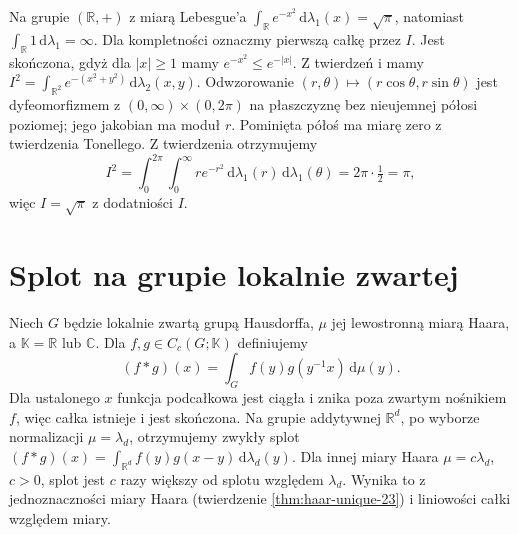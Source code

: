 \begin{przyklad}
Na grupie $(\mathbb{R},+)$ z miarą Lebesgue'a $\int_\mathbb{R} e^{-x^2}\,\mathrm d\lambda_1(x)=\sqrt\pi$, natomiast $\int_{\mathbb R}1\,\mathrm d\lambda_1=\infty$. Dla kompletności oznaczmy pierwszą całkę przez $I$.
Jest skończona, gdyż dla $|x|\ge1$ mamy
$e^{-x^2}\le e^{-|x|}$. Z twierdzeń
 i 
mamy $I^2=\int_{\mathbb R^2}e^{-(x^2+y^2)}
\,\mathrm d\lambda_2(x,y)$. Odwzorowanie
$(r,\theta)\mapsto(r\cos\theta,r\sin\theta)$
jest dyfeomorfizmem z $(0,\infty)\times(0,2\pi)$
na płaszczyznę bez nieujemnej półosi poziomej;
jego jakobian ma moduł $r$. Pominięta półoś ma
miarę zero z twierdzenia Tonellego. Z twierdzenia
 otrzymujemy
\[
 I^2=\int_0^{2\pi}\int_0^\infty re^{-r^2}
    \,\mathrm d\lambda_1(r)\,\mathrm d\lambda_1(\theta)
 =2\pi\cdot\tfrac12=\pi,
\]
więc $I=\sqrt\pi$ z dodatniości $I$.
\end{przyklad}

\section{Splot na grupie lokalnie zwartej}
\begin{definicja}
\label{it:def:haar-convolution}
Niech $G$ będzie lokalnie zwartą grupą Hausdorffa,
$\mu$ jej lewostronną miarą Haara, a
$\mathbb K=\mathbb R$ lub $\mathbb C$.
Dla $f,g\in C_c(G;\mathbb K)$ definiujemy
\[
 (f*g)(x)=\int_G f(y)g(y^{-1}x)\,\mathrm d\mu(y).
\]
Dla ustalonego $x$ funkcja podcałkowa jest ciągła
i znika poza zwartym nośnikiem $f$, więc całka
istnieje i jest skończona. Na grupie addytywnej
$\mathbb R^d$, po wyborze normalizacji $\mu=\lambda_d$,
otrzymujemy zwykły splot
$(f*g)(x)=\int_{\mathbb R^d}f(y)g(x-y)
\,\mathrm d\lambda_d(y)$.
Dla innej miary Haara $\mu=c\lambda_d$, $c>0$,
splot jest $c$ razy większy od splotu względem
$\lambda_d$. Wynika to z jednoznaczności miary Haara
(twierdzenie \ref{thm:haar-unique-23}) i liniowości
całki względem miary.
\end{definicja}

